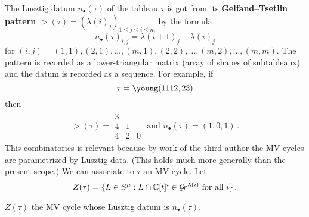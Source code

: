 \documentclass[draft]{article}
\begin{document}
The Lusztig datum $n_\bullet(\tau)$ of the tableau $\tau$ is got from its \textbf{Gelfand--Tsetlin pattern} $\gt(\tau) = (\lambda(i)_j)_{1\le j\le i\le m}$  by the formula 
$$
n_\bullet(\tau)_{i,j} = \lambda(i+1)_j - \lambda(i)_j
$$
for $(i,j) = (1,1), (2,1), \dots, (m,1), (2,2),\dots,(m,2),\dots,(m,m)$. The pattern is recorded as a lower-triangular matrix (array of shapes of subtableaux) and the datum is recorded as a sequence.
% 
For example, if 
\[
    \tau = \young(1112,23) 
\]
then
\begin{gather*}
\gt(\tau) = \begin{matrix}
       3 \\
       4 & 1 \\ 
       4 & 2 & 0 
   \end{matrix} \text{ and }
   n_\bullet(\tau) = (1,0,1)\,. 
\end{gather*}
% 
This combinatorics is relevant because by work of the third author the MV cycles are parametrized by Lusztig data. (This holds much more generally than the present scope.)
% 
We can associate to $\tau$ an MV cycle.  Let 
%  
\begin{equation*}
    Z(\tau) = 
        \{
            L\in S^\mu : L\cap\mathbb C[t]^i\in\mathcal{G}\!r^{\lambda(i)}\text{ for all }i 
        \}\,. 
\end{equation*}
% 
\begin{proposition}
    \label{pr:newmvdes}
    $\overline{Z(\tau)}$ the MV cycle whose Lusztig datum is $n_\bullet(\tau)$. 
\end{proposition}
% 

% 
% 
% 
% 
\end{document}
